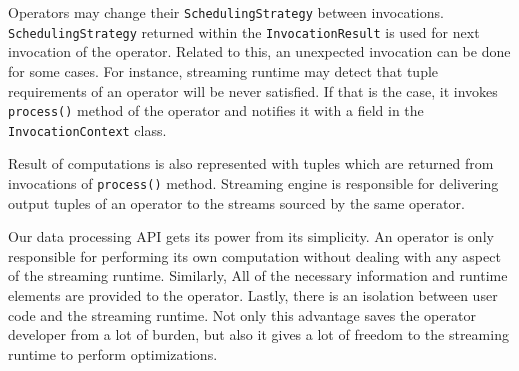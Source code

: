 Operators may change their \texttt{SchedulingStrategy} between invocations. \texttt{SchedulingStrategy} returned within the \texttt{InvocationResult} is used for next invocation of the operator. Related to this, an unexpected invocation can be done for some cases. For instance, streaming runtime may detect that tuple requirements of an operator will be never satisfied. If that is the case, it invokes \texttt{process()} method of the operator and notifies it with a field in the \texttt{InvocationContext} class.

Result of computations is also represented with tuples which are returned from invocations of \texttt{process()} method. Streaming engine is responsible for delivering output tuples of an operator to the streams sourced by the same operator.

Our data processing API gets its power from its simplicity. An operator is only responsible for performing its own computation without dealing with any aspect of the streaming runtime. Similarly, All of the necessary information and runtime elements are provided to the operator. Lastly, there is an isolation between user code and the streaming runtime. Not only this advantage saves the operator developer from a lot of burden, but also it gives a lot of freedom to the streaming runtime to perform optimizations.

